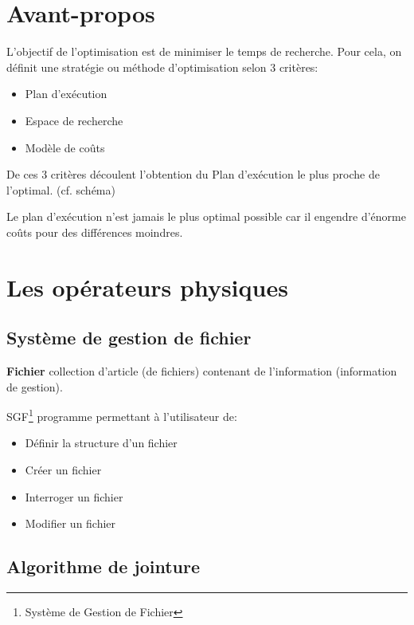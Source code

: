 \documentclass[12pt,a4paper,openany]{book}
\begin{document}
	\thispagestyle{empty} %
	\titleBC 
	\dominitoc
	\setcounter{tocdepth}{1}
	\setcounter{secnumdepth}{3}
	\setcounter{minitocdepth}{1}
	\chapter*{Avant-propos}
L'objectif de l'optimisation  est de minimiser le temps de recherche. Pour cela, on définit une stratégie ou méthode d'optimisation selon 3 critères:
\begin{itemize}
	\item Plan d'exécution
	\item Espace de recherche
	\item Modèle de coûts
\end{itemize}
De ces 3 critères découlent l'obtention du Plan d'exécution le plus proche de l'optimal. 
(cf. schéma)

\begin{remarque}
Le plan d'exécution n'est jamais le plus optimal possible car il engendre d'énorme coûts pour des différences moindres.
\end{remarque}

	\tableofcontents

\chapter{Les opérateurs physiques}
\section{Système de gestion de fichier}
\begin{definition}
	\textbf{Fichier} collection d'article (de fichiers) contenant de l'information (information de gestion).
\end{definition}
\begin{definition}
	SGF\footnote{Système de Gestion de Fichier} programme permettant à l'utilisateur de: 
	\begin{itemize}
		\item Définir la structure d'un fichier
		\item Créer un fichier
		\item Interroger un fichier
		\item Modifier un fichier
	\end{itemize}
\end{definition}
\section{Algorithme de jointure}
\end{document}
